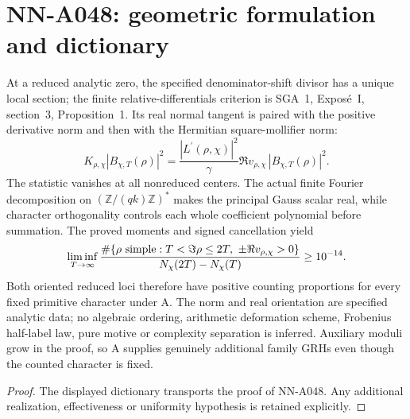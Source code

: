 \section{NN-A048: geometric formulation and dictionary}
\begin{geometricstatement}[NN-A048]
At a reduced analytic zero, the specified denominator-shift divisor has a unique local section; the finite relative-differentials criterion is SGA~1, Expos\'e~I, section~3, Proposition~1. Its real normal tangent is paired with the positive derivative norm and then with the Hermitian square-mollifier norm: \[K_{\rho,\chi}|B_{\chi,T}(\rho)|^2=\frac{|L^\prime(\rho,\chi)|^2}{\gamma}\Re v_{\rho,\chi}\,|B_{\chi,T}(\rho)|^2.\] The statistic vanishes at all nonreduced centers. The actual finite Fourier decomposition on $(\mathbb Z/(qk)\mathbb Z)^*$ makes the principal Gauss scalar real, while character orthogonality controls each whole coefficient polynomial before summation. The proved moments and signed cancellation yield \[\liminf_{T\to\infty}\frac{\#\{\rho\ {\rm simple}:T<\Im\rho\le2T,\ \pm\Re v_{\rho,\chi}>0\}}{N_\chi(2T)-N_\chi(T)}\ge10^{-14}.\] Both oriented reduced loci therefore have positive counting proportions for every fixed primitive character under A. The norm and real orientation are specified analytic data; no algebraic ordering, arithmetic deformation scheme, Frobenius half-label law, pure motive or complexity separation is inferred. Auxiliary moduli grow in the proof, so A supplies genuinely additional family GRHs even though the counted character is fixed.
\end{geometricstatement}
\begin{proof} The displayed dictionary transports the proof of NN-A048. Any additional realization, effectiveness or uniformity hypothesis is retained explicitly.\end{proof}


